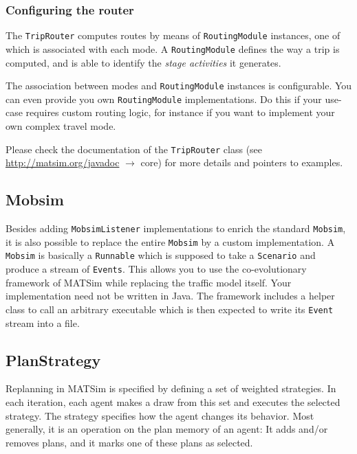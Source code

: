 \subsubsection{Configuring the router}

The \lstinline{TripRouter} computes routes by means of \lstinline{RoutingModule}
instances, one of which is associated with each mode.
A \lstinline{RoutingModule} defines the way a trip is computed,
and is able to identify the \emph{stage activities} it generates.

The association between modes and \lstinline{RoutingModule} instances is configurable.
You can even provide you own \lstinline{RoutingModule} implementations.
Do this if your use-case requires custom routing logic, for instance if you
want to implement your own complex travel mode.

Please check the documentation of the \lstinline{TripRouter} class  (see \url{http://matsim.org/javadoc} $\to$ core) for more details and pointers to examples.


\subsection{Mobsim}
\label{sec:mobsim-extension-point}

Besides adding \lstinline|MobsimListener| implementations to enrich the standard \lstinline|Mobsim|, it is also possible to replace
the entire \lstinline|Mobsim| by a custom implementation. A \lstinline|Mobsim| is basically
a \lstinline|Runnable| which is supposed to take a \lstinline|Scenario| and
produce a stream of \lstinline|Events|.
This allows you to use the co-evolutionary framework of MATSim while replacing the traffic model itself.
Your implementation need not be written in Java. The framework includes a helper class to call an arbitrary
executable which is then expected to write its \lstinline|Event| stream into a file. 

\subsection{PlanStrategy}
\label{sec:replanning-extension-point}
Replanning in MATSim is specified by defining a set of weighted strategies. In each
iteration, each agent makes a draw from this set and executes the selected strategy. The
strategy specifies how the agent changes its behavior. Most generally, it is an operation on the plan memory
of an agent: It adds and/or removes plans, and it marks one of these plans as selected.

